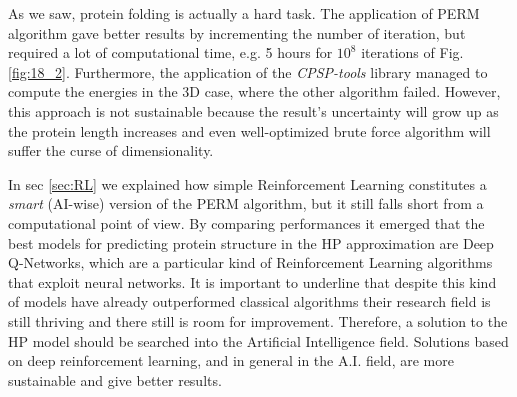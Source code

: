As we saw, protein folding is actually a hard task.
The application of PERM algorithm gave better results by incrementing the number of iteration, but required a lot of computational time, e.g. 5 hours for $10^8$ iterations of Fig. \ref{fig:18_2}.
Furthermore, the application of the \emph{CPSP-tools} library managed to compute the energies in the 3D case, where the other algorithm failed.
However, this approach is not sustainable because the result's uncertainty will grow up as the protein length increases and even well-optimized brute force algorithm will suffer the curse of dimensionality.

In sec \ref{sec:RL} we explained how simple Reinforcement Learning  constitutes a \emph{smart} (AI-wise) version of the PERM algorithm, but it still falls short from a computational point of view.
By comparing performances it emerged that the best models for predicting protein structure in the HP approximation are Deep Q-Networks, which are a particular kind of Reinforcement Learning algorithms that exploit neural networks.
It is important to underline that despite this kind of models have already outperformed classical algorithms their research field is still thriving and there still is room for improvement.
Therefore, a solution to the HP model should be searched into the Artificial Intelligence field.
Solutions based on deep reinforcement learning, and in general in the A.I. field, are more sustainable and give better results.